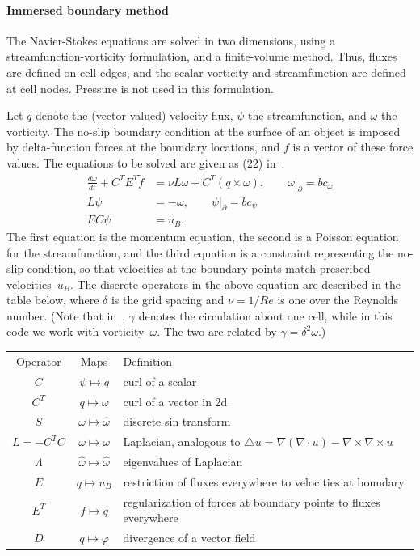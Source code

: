 \documentclass[11pt]{article}
\begin{document}
\paragraph{Immersed boundary method}
The Navier-Stokes equations are solved in two dimensions, using a streamfunction-vorticity formulation, and a finite-volume method.  Thus, fluxes are defined on cell edges, and the scalar vorticity and streamfunction are defined at cell nodes.  Pressure is not used in this formulation.

Let $q$ denote the (vector-valued) velocity flux, $\psi$ the streamfunction, and $\omega$ the vorticity.  The no-slip boundary condition at the surface of an object is imposed by delta-function forces at the boundary locations, and $f$ is a vector of these force values.  The equations to be solved are given as (22) in~\cite{ColTai-07}:
\begin{align}
	\frac{d\omega}{dt} + C^TE^T\tilde f &= \nu L\omega + C^T(q\times\omega),
		\qquad \omega\big|_\partial = bc_\omega
		\label{eq:navier_stokes}\\
	L\psi &= -\omega,\qquad \psi\big|_\partial = bc_\psi
		\label{eq:poisson}\\
	EC\psi &= u_B.
		\label{eq:no_slip}
\end{align}
The first equation is the momentum equation, the second is a Poisson equation for the streamfunction, and the third equation is a constraint representing the no-slip condition, so that velocities at the boundary points match prescribed velocities~$u_B$. The discrete operators in the above equation are described in the table below, where $\delta$ is the grid spacing and $\nu=1/Re$ is one over the Reynolds number.  (Note that in~\cite{ColTai-07}, $\gamma$ denotes the circulation about one cell, while in this code we work with vorticity~$\omega$.  The two are related by $\gamma = \delta^2\omega$.)
\begin{center}
\begin{tabular}{ccp{3.7in}}
Operator & Maps & Definition\\
$C$ 	& $\psi\mapsto q$ & curl of a scalar\\
$C^T$ 	& $q\mapsto \omega$ & curl of a vector in 2d\\
$S$ 	& $\omega\mapsto\hat\omega$ & discrete sin transform\\
$L=-C^TC$	& $\omega\mapsto\omega$ & Laplacian, analogous to $\triangle u = \nabla(\nabla\cdot u) - \nabla\times\nabla\times u$\\
$\Lambda$	& $\hat\omega\mapsto\hat\omega$ & eigenvalues of Laplacian\\
$E$ 	& $q\mapsto u_B$ & restriction of fluxes everywhere to velocities at boundary\\
$E^T$	& $f\mapsto q$ & regularization of forces at boundary points to fluxes everywhere\\
$D$		& $q\mapsto \varphi$ & divergence of a vector field
\end{tabular}
\end{center}
\end{document}
